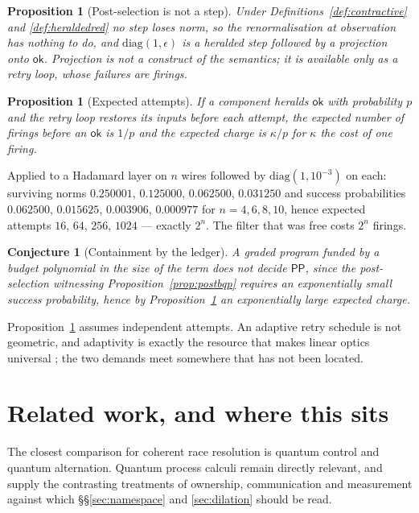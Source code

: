 \documentclass[11pt,a4paper]{article}
\theoremstyle{plain}
\newtheorem{proposition}[theorem]{Proposition}
\newtheorem{conjecture}[theorem]{Conjecture}
\theoremstyle{definition}
\theoremstyle{remark}
\begin{document}
\begin{proposition}[Post-selection is not a step]\label{prop:nopostsel}
Under Definitions~\ref{def:contractive} and \ref{def:heraldedred} no step loses
norm, so the renormalisation at observation has nothing to do, and
$\mathrm{diag}(1,\epsilon)$ is a heralded step followed by a projection onto
$\mathsf{ok}$. Projection is not a construct of the semantics; it is available
only as a retry loop, whose failures are firings.
\end{proposition}

\begin{proposition}[Expected attempts]\label{prop:attempts}
If a component heralds $\mathsf{ok}$ with probability $p$ and the retry loop
restores its inputs before each attempt, the expected number of firings before
an $\mathsf{ok}$ is $1/p$ and the expected charge is $\kappa/p$ for $\kappa$ the
cost of one firing.
\end{proposition}

Applied to a Hadamard layer on $n$ wires followed by $\mathrm{diag}(1,10^{-3})$
on each: surviving norms $0.250001$, $0.125000$, $0.062500$, $0.031250$ and
success probabilities $0.062500$, $0.015625$, $0.003906$, $0.000977$ for
$n = 4,6,8,10$, hence expected attempts $16$, $64$, $256$, $1024$ --- exactly
$2^{n}$. The filter that was free costs $2^n$ firings.

\begin{conjecture}[Containment by the ledger]\label{conj:ledger}
A graded program funded by a budget polynomial in the size of the term does not
decide $\mathsf{PP}$, since the post-selection witnessing
Proposition~\ref{prop:postbqp} requires an exponentially small success
probability, hence by Proposition~\ref{prop:attempts} an exponentially large
expected charge.
\end{conjecture}

Proposition~\ref{prop:attempts} assumes independent attempts. An adaptive retry
schedule is not geometric, and adaptivity is exactly the resource that makes
linear optics universal \cite{KLM}; the two demands meet somewhere that has not
been located.

\section{Related work, and where this sits}\label{sec:related}

The closest comparison for coherent race resolution is quantum control and
quantum alternation. Quantum process calculi remain directly relevant, and
supply the contrasting treatments of ownership, communication and measurement
against which \S\S\ref{sec:namespace} and \ref{sec:dilation} should be read.
\end{document}
